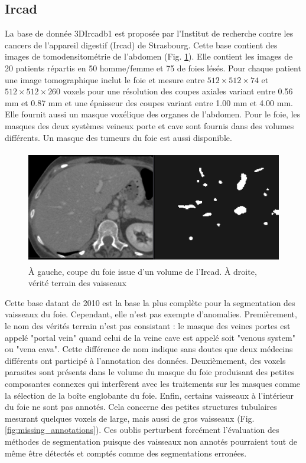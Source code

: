 \subsection{Ircad}

La base de donnée 3DIrcadb1 est proposée par l'Institut de recherche contre les cancers de l'appareil digestif (Ircad) de Strasbourg. Cette base contient des images de tomodensitométrie de l'abdomen (Fig. \ref{fig:Ircad_examples}). Elle contient les images de 20 patients répartis en 50 \percent homme/femme et 75 \percent de foies lésés. Pour chaque patient une image tomographique inclut le foie et mesure entre $512 \times 512 \times 74$ et $512 \times 512 \times 260$ voxels pour une résolution des coupes axiales variant entre 0.56 mm et 0.87 mm et une épaisseur des coupes variant entre 1.00 mm et 4.00 mm. Elle fournit aussi un masque voxélique des organes de l'abdomen. Pour le foie, les masques des deux systèmes veineux porte et cave sont fournis dans des volumes différents. Un masque des tumeurs du foie est aussi disponible.

\begin{figure}
    \centering
    \includegraphics[height=5cm]{Images/Ircad_examples.png}
    \caption{À gauche, coupe du foie issue d'un volume de l'Ircad. À droite, vérité terrain des vaisseaux}
    \label{fig:Ircad_examples}
\end{figure}

Cette base datant de 2010 est la base la plus complète pour la segmentation des vaisseaux du foie. Cependant, elle n'est pas exempte d'anomalies. Premièrement, le nom des vérités terrain n'est pas consistant : le masque des veines portes est appelé "portal vein" quand celui de la veine cave est appelé soit "venous system" ou "vena cava". Cette différence de nom indique sans doutes que deux médecins différents ont participé à l'annotation des données. Deuxièmement, des voxels parasites sont présents dans le volume du masque du foie produisant des petites composantes connexes qui interfèrent avec les traitements sur les masques comme la sélection de la boîte englobante du foie. Enfin, certains vaisseaux à l'intérieur du foie ne sont pas annotés. Cela concerne des petites structures tubulaires mesurant quelques voxels de large, mais aussi de gros vaisseaux (Fig. \ref{fig:missing_annotations}). Ces oublis perturbent forcément l'évaluation des méthodes de segmentation puisque des vaisseaux non annotés pourraient tout de même être détectés et comptés comme des segmentations erronées. 

